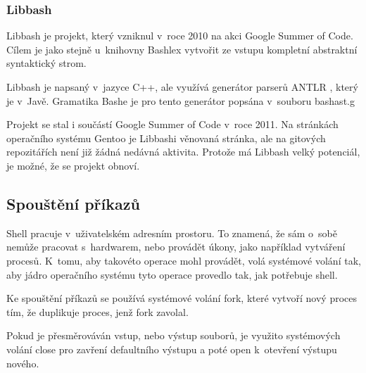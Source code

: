 \documentclass[thesis=M,czech]{FITthesis}[2012/06/26]
\begin{document}

%
%
%
\subsubsection{Libbash}

Libbash \cite{libbash} je projekt, který vzniknul v~roce 2010 na akci Google Summer of Code. Cílem je jako stejně u~knihovny Bashlex vytvořit ze vstupu kompletní abstraktní syntaktický strom.

Libbash je napsaný v~jazyce C++, ale využívá generátor parserů ANTLR \cite{antlr}, který je v~Javě. Gramatika Bashe je pro tento generátor popsána v~souboru bashast.g

Projekt se stal i součástí Google Summer of Code v~roce 2011. Na stránkách operačního systému Gentoo \cite{gentoolibbash} je Libbashi věnovaná stránka, ale na gitových repozitářích není již žádná nedávná aktivita. Protože má Libbash velký potenciál, je možné, že se projekt obnoví.





%
%
%
\subsection{Spouštění příkazů}\label{sec:exec}

Shell pracuje v~uživatelském adresním prostoru. To znamená, že sám o~sobě nemůže pracovat s~hardwarem, nebo provádět úkony, jako například vytváření procesů. K~tomu, aby takovéto operace mohl provádět, volá systémové volání tak, aby jádro operačního systému tyto operace provedlo tak, jak potřebuje shell.

Ke spouštění příkazů se používá systémové volání fork, které vytvoří nový proces tím, že duplikuje proces, jenž fork zavolal.

Pokud je přesměrováván vstup, nebo výstup souborů, je využito systémových volání close pro zavření defaultního výstupu a poté open k~otevření výstupu nového.
\end{document}
